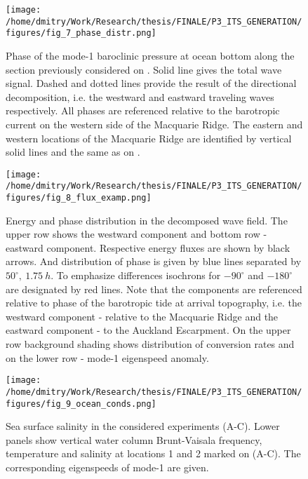 \documentclass[12pt]{article}
\newcommand{\SCALEO}{2}
\newcommand{\SCALET}{1.25}
\begin{document}
\begin{figure}
	\centering
	\texttt{[image: /home/dmitry/Work/Research/thesis/FINALE/P3\_ITS\_GENERATION/figures/fig\_7\_phase\_distr.png]}
	\caption{Phase of the mode-1 baroclinic pressure at ocean bottom along the section 
	previously 
	considered on . Solid line gives the total wave signal. Dashed and dotted 
	lines provide the result of the directional decomposition, i.e. the westward and eastward 
	traveling waves	respectively. All phases are referenced relative to the barotropic current on 
	the western side of the Macquarie Ridge. The eastern and western locations of the Macquarie 
	Ridge are identified by vertical solid lines and the same as on .}
\label{C3.fig:2d_phase}
\end{figure}

\begin{figure}
	\centering
	\texttt{[image: /home/dmitry/Work/Research/thesis/FINALE/P3\_ITS\_GENERATION/figures/fig\_8\_flux\_examp.png]}
	\caption{Energy and phase distribution in the decomposed wave field. The upper row shows the 
	westward component and bottom row - eastward component. Respective energy fluxes are shown by 
	black arrows. And distribution of phase is given by blue lines separated by 
	$50^{\circ},~1.75~h$. To emphasize differences isochrons for $-90^{\circ}$ and $-180^{\circ}$ 
	are 
	designated by red lines. Note that the components are referenced relative to phase of the 
	barotropic tide at arrival topography, i.e. the westward component  - relative to the 
	Macquarie Ridge and the eastward component - to the Auckland Escarpment. On the upper row 
	background shading shows distribution of conversion rates and on the lower row - mode-1 
	eigenspeed anomaly.}
	\label{C3.fig:wv_fld_dist}
\end{figure}

\begin{figure}
	\centering
	\texttt{[image: /home/dmitry/Work/Research/thesis/FINALE/P3\_ITS\_GENERATION/figures/fig\_9\_ocean\_conds.png]}
	\caption{Sea surface salinity in the considered experiments (A-C). Lower panels show 
	vertical water column Brunt-Vaisala frequency, temperature and salinity at locations 1 and 2 
	marked on (A-C). The corresponding eigenspeeds of mode-1 are given.}
	\label{C3.fig:ocean_cond}
\end{figure}
\end{document}
